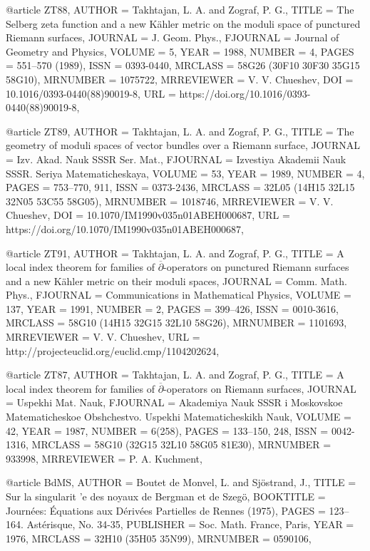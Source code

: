 @article {ZT88,
    AUTHOR = {Takhtajan, L. A. and Zograf, P. G.},
     TITLE = {The {S}elberg zeta function and a new {K}\"ahler metric on the
              moduli space of punctured {R}iemann surfaces},
   JOURNAL = {J. Geom. Phys.},
  FJOURNAL = {Journal of Geometry and Physics},
    VOLUME = {5},
      YEAR = {1988},
    NUMBER = {4},
     PAGES = {551--570 (1989)},
      ISSN = {0393-0440},
   MRCLASS = {58G26 (30F10 30F30 35G15 58G10)},
  MRNUMBER = {1075722},
MRREVIEWER = {V. V. Chueshev},
       DOI = {10.1016/0393-0440(88)90019-8},
       URL = {https://doi.org/10.1016/0393-0440(88)90019-8},
}

@article {ZT89,
    AUTHOR = {Takhtajan, L. A. and Zograf, P. G.},
     TITLE = {The geometry of moduli spaces of vector bundles over a
              {R}iemann surface},
   JOURNAL = {Izv. Akad. Nauk SSSR Ser. Mat.},
  FJOURNAL = {Izvestiya Akademii Nauk SSSR. Seriya Matematicheskaya},
    VOLUME = {53},
      YEAR = {1989},
    NUMBER = {4},
     PAGES = {753--770, 911},
      ISSN = {0373-2436},
   MRCLASS = {32L05 (14H15 32L15 32N05 53C55 58G05)},
  MRNUMBER = {1018746},
MRREVIEWER = {V. V. Chueshev},
       DOI = {10.1070/IM1990v035n01ABEH000687},
       URL = {https://doi.org/10.1070/IM1990v035n01ABEH000687},
}

@article {ZT91,
    AUTHOR = {Takhtajan, L. A. and Zograf, P. G.},
     TITLE = {A local index theorem for families of
              {$\overline\partial$}-operators on punctured {R}iemann
              surfaces and a new {K}\"ahler metric on their moduli spaces},
   JOURNAL = {Comm. Math. Phys.},
  FJOURNAL = {Communications in Mathematical Physics},
    VOLUME = {137},
      YEAR = {1991},
    NUMBER = {2},
     PAGES = {399--426},
      ISSN = {0010-3616},
   MRCLASS = {58G10 (14H15 32G15 32L10 58G26)},
  MRNUMBER = {1101693},
MRREVIEWER = {V. V. Chueshev},
       URL = {http://projecteuclid.org/euclid.cmp/1104202624},
}

@article {ZT87,
    AUTHOR = {Takhtajan, L. A. and Zograf, P. G.},
     TITLE = {A local index theorem for families of
              {$\overline\partial$}-operators on {R}iemann surfaces},
   JOURNAL = {Uspekhi Mat. Nauk},
  FJOURNAL = {Akademiya Nauk SSSR i Moskovskoe Matematicheskoe Obshchestvo.
              Uspekhi Matematicheskikh Nauk},
    VOLUME = {42},
      YEAR = {1987},
    NUMBER = {6(258)},
     PAGES = {133--150, 248},
      ISSN = {0042-1316},
   MRCLASS = {58G10 (32G15 32L10 58G05 81E30)},
  MRNUMBER = {933998},
MRREVIEWER = {P. A. Kuchment},
}

@article {BdMS,
    AUTHOR = {Boutet de Monvel, L. and Sj\"ostrand, J.},
     TITLE = {Sur la singularit 'e des noyaux de {B}ergman et de {S}zegö},
 BOOKTITLE = {Journ\'ees: \'Equations aux {D}\'eriv\'ees {P}artielles de {R}ennes
              (1975)},
     PAGES = {123--164. Ast\'erisque, No. 34-35},
 PUBLISHER = {Soc. Math. France, Paris},
      YEAR = {1976},
   MRCLASS = {32H10 (35H05 35N99)},
  MRNUMBER = {0590106},
}

